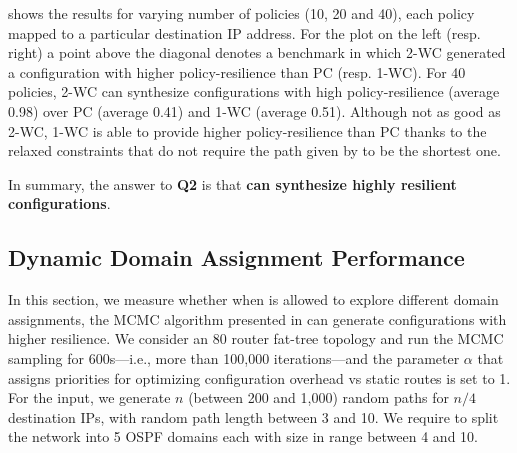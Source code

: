 shows the results
for varying number of policies (10, 20 and 40), each policy mapped 
to a particular destination IP address. 
For the plot on the left (resp. right)
a point above the diagonal 
denotes a benchmark in which 2-WC
generated a configuration with higher policy-resilience than
PC (resp. 1-WC).
For 40 policies, 
2-WC can synthesize 
configurations with high policy-resilience
(average 0.98) over PC (average 0.41) and 1-WC (average 0.51). 
Although not as good as 2-WC, 1-WC is able to provide 
higher policy-resilience than
PC thanks to the relaxed constraints that do not require
the path given by \genesis to be the shortest one.

\begin{figure}
	\centering
\end{figure}
In summary, the answer to \textbf{Q2} is that
\textbf{\name can synthesize highly resilient configurations}.


\subsection{Dynamic Domain Assignment Performance} \label{sec:mcmceval}

In this section, we measure whether
when \name  is allowed to explore different domain assignments,
the MCMC algorithm presented in 
can 
generate configurations
with higher resilience. 
We consider an 80 router fat-tree topology and run the MCMC sampling
for 600s---i.e., more than 100,000 iterations---and the parameter
$\alpha$ that assigns priorities for optimizing configuration overhead
vs static routes is set to 1. For the input, we generate $n$ (between
200 and 1,000) random paths for $n/4$ destination IPs, with random
path length between 3 and 10.  We require \name to split the network
into 5 OSPF domains each with size in range between 4 and 10.

